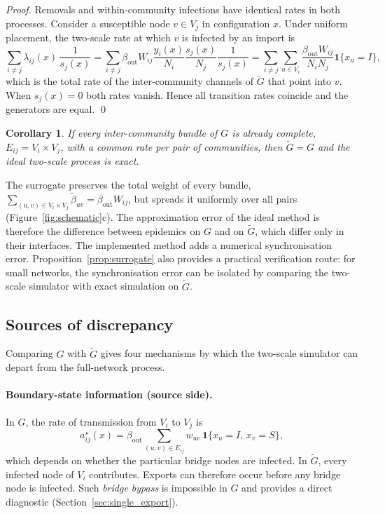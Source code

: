 \documentclass[a4paper,fleqn]{cas-sc}
\newtheorem{corollary}{Corollary}
\newcommand{\ind}{\mathbf{1}}
\begin{document}
\begin{proof}
Removals and within-community infections have identical rates in both processes. Consider a susceptible node $v\in V_j$ in configuration $x$. Under uniform placement, the two-scale rate at which $v$ is infected by an import is
\[
\sum_{i\neq j}\lambda_{ij}(x)\,\frac{1}{s_j(x)}
=\sum_{i\neq j}\beta_{\mathrm{out}}W_{ij}\frac{y_i(x)}{N_i}\frac{s_j(x)}{N_j}\frac{1}{s_j(x)}
=\sum_{i\neq j}\sum_{u\in V_i}\frac{\beta_{\mathrm{out}}W_{ij}}{N_iN_j}\ind\{x_u=I\},
\]
which is the total rate of the inter-community channels of $\tilde G$ that point into $v$. When $s_j(x)=0$ both rates vanish. Hence all transition rates coincide and the generators are equal. \qed
\end{proof}

\begin{corollary}
\label{cor:exact}
If every inter-community bundle of $G$ is already complete, $E_{ij}=V_i\times V_j$, with a common rate per pair of communities, then $\tilde G=G$ and the ideal two-scale process is exact.
\end{corollary}

The surrogate preserves the total weight of every bundle, $\sum_{(u,v)\in V_i\times V_j}\tilde\beta_{uv}=\beta_{\mathrm{out}}W_{ij}$, but spreads it uniformly over all pairs (Figure~\ref{fig:schematic}c). The approximation error of the ideal method is therefore the difference between epidemics on $G$ and on $\tilde G$, which differ only in their interfaces. The implemented method adds a numerical synchronisation error. Proposition~\ref{prop:surrogate} also provides a practical verification route: for small networks, the synchronisation error can be isolated by comparing the two-scale simulator with exact simulation on $\tilde G$.

\subsection{Sources of discrepancy}
\label{sec:sources}

Comparing $G$ with $\tilde G$ gives four mechanisms by which the two-scale simulator can depart from the full-network process.

\paragraph{Boundary-state information (source side).}
In $G$, the rate of transmission from $V_i$ to $V_j$ is
\begin{equation}
\label{eq:exact_rate}
a^\star_{ij}(x)=\beta_{\mathrm{out}}\sum_{(u,v)\in E_{ij}}w_{uv}\,\ind\{x_u=I,\,x_v=S\},
\end{equation}
which depends on whether the particular bridge nodes are infected. In $\tilde G$, every infected node of $V_i$ contributes. Exports can therefore occur before any bridge node is infected. Such \emph{bridge bypass} is impossible in $G$ and provides a direct diagnostic (Section~\ref{sec:single_export}).
\end{document}

